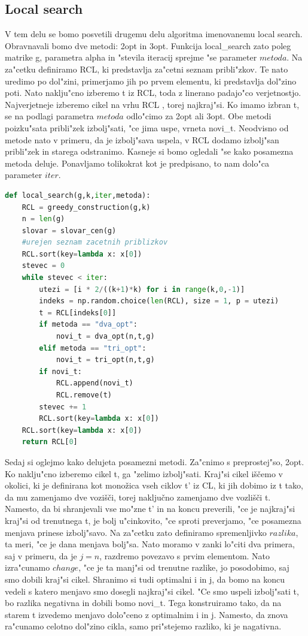 \documentclass[12pt,a4paper]{amsart}
\theoremstyle{definition} %
\theoremstyle{plain} %
\begin{document}
\subsection{Local search} 

V tem delu se bomo posvetili drugemu delu algoritma imenovanemu local search. Obravnavali bomo dve metodi: 2opt in 3opt. Funkcija local\_search zato poleg matrike g, parametra alpha in "stevila iteracij sprejme "se parameter $metoda$. 
Na za"cetku definiramo RCL, ki predstavlja za"cetni seznam pribli"zkov. Te nato uredimo po dol"zini, primerjamo jih po prvem elementu, ki predstavlja dol"zino poti. Nato naklju"cno izberemo t iz RCL, toda z linerano padajo"co verjetnostjo. Najverjetneje izberemo cikel na vrhu RCL , torej najkraj"si. Ko imamo izbran t, se na podlagi parametra $metoda$ odlo"cimo za 2opt ali 3opt. Obe metodi poizku"sata pribli"zek izbolj"sati, "ce jima uspe, vrneta novi\_t. Neodvisno od metode nato v primeru, da je izbolj"sava uspela, v RCL dodamo izbolj"san pribli"zek in starega odstranimo. Kasneje si bomo ogledali "se kako posamezna metoda deluje. Ponavljamo tolikokrat kot je predpisano, to nam dolo"ca parameter $iter$. 


\begin{lstlisting}[language=Python]
def local_search(g,k,iter,metoda):
    RCL = greedy_construction(g,k)
    n = len(g)
    slovar = slovar_cen(g)
    #urejen seznam zacetnih priblizkov
    RCL.sort(key=lambda x: x[0])
    stevec = 0
    while stevec < iter:
        utezi = [i * 2/((k+1)*k) for i in range(k,0,-1)]
        indeks = np.random.choice(len(RCL), size = 1, p = utezi)
        t = RCL[indeks[0]]
        if metoda == "dva_opt":
            novi_t = dva_opt(n,t,g)
        elif metoda == "tri_opt":
            novi_t = tri_opt(n,t,g)      
        if novi_t:
            RCL.append(novi_t)
            RCL.remove(t)   
        stevec += 1
        RCL.sort(key=lambda x: x[0])
    RCL.sort(key=lambda x: x[0])
    return RCL[0]
\end{lstlisting}

Sedaj si oglejmo kako delujeta posamezni metodi. Za"cnimo s preprostej"so, 2opt. 
Ko naklju"cno izberemo cikel t, ga "zelimo izbolj"sati. Kraj"si cikel iščemo v okolici, ki je definirana kot monožica vseh ciklov t' iz CL, 
ki jih dobimo iz t tako, da mu zamenjamo dve vozišči, torej naključno zamenjamo dve vozlišči t. Namesto, da bi shranjevali vse mo"zne  t' in na koncu preverili, "ce je najkraj"si kraj"si od trenutnega t, je bolj u"cinkovito, "ce sproti preverjamo, "ce posamezna menjava prinese izbolj"savo. Na za"cetku zato definiramo spremenljivko $razlika$, ta meri, "ce je dana menjava bolj"sa. Nato moramo v zanki lo"citi dva primera, saj v primeru, da je $j = n$, razdremo povezavo s prvim elementom. Nato izra"cunamo $change$, "ce je ta manj"si od trenutne razlike, jo posodobimo, saj smo dobili kraj"si cikel. Shranimo si tudi optimalni i in j, da bomo na koncu vedeli s katero menjavo smo dosegli najkraj"si cikel. "Ce smo uspeli izbolj"sati t, bo razlika negativna in dobili bomo novi\_t. Tega konstruiramo tako, da na starem t izvedemo menjavo dolo"ceno z optimalnim i in j. Namesto, da znova ra"cunamo celotno dol"zino cikla, samo pri"stejemo razliko, ki je nagativna. 
\end{document}
